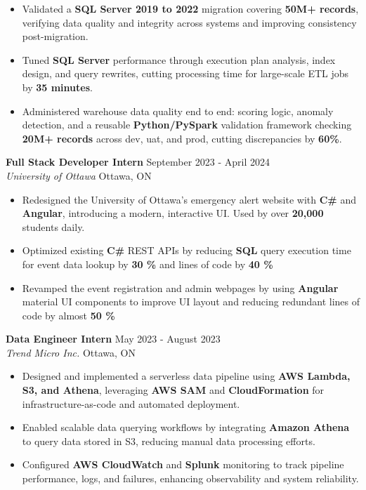 \documentclass[a4paper]{article}
\begin{document}
\begin{itemize}
\item Validated a \textbf{SQL Server 2019 to 2022} migration covering \textbf{50M+ records}, verifying data quality and integrity across systems and improving consistency post-migration.

\item Tuned \textbf{SQL Server} performance through execution plan analysis, index design, and query rewrites, cutting processing time for large-scale ETL jobs by \textbf{35 minutes}.

\item Administered warehouse data quality end to end: scoring logic, anomaly detection, and a reusable \textbf{Python/PySpark} validation framework checking \textbf{20M+ records} across dev, uat, and prod, cutting discrepancies by \textbf{60\%}.

\end{itemize}

\textbf{Full Stack Developer Intern } \hfill September 2023 - April 2024\\
\textit{University of Ottawa} \hfill Ottawa, ON\\
\vspace{-2mm}
\begin{itemize} \itemsep -4pt
    \item Redesigned the University of Ottawa's emergency alert website with \textbf{C\#} and \textbf{Angular}, introducing a modern, interactive UI. Used by over \textbf{20,000} students daily.
     \item Optimized existing \textbf{C\#} REST APIs by reducing \textbf{SQL} query execution time for event data lookup by \textbf{30 \%} and lines of code by \textbf{40 \%}
    \item Revamped the event registration and admin webpages by using \textbf{Angular} material UI components to improve UI layout and reducing redundant lines of code by almost \textbf{50 \%}
\end{itemize}

\textbf{Data Engineer Intern} \hfill May 2023 - August 2023\\
\textit{Trend Micro Inc.} \hfill Ottawa, ON\\
\vspace{-2mm}
\begin{itemize} \itemsep -4pt

\item Designed and implemented a serverless data pipeline using \textbf{AWS Lambda, S3, and Athena}, leveraging \textbf{AWS SAM} and \textbf{CloudFormation} for infrastructure-as-code and automated deployment.

\item Enabled scalable data querying workflows by integrating \textbf{Amazon Athena} to query data stored in S3, reducing manual data processing efforts.

\item Configured \textbf{AWS CloudWatch} and \textbf{Splunk} monitoring to track pipeline performance, logs, and failures, enhancing observability and system reliability.

\end{itemize}
\end{document}
